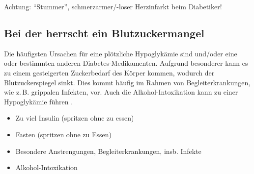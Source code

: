 \begin{Danger}
  \item Achtung: \enquote{Stummer}, schmerzarmer/-loser Herzinfarkt beim Diabetiker!
\end{Danger}



\subsection{Bei der  herrscht ein Blutzuckermangel}
\label{topic:hypoglykaemie}



{%
Die häufigsten Ursachen für eine plötzliche Hypoglykämie
sind  und/oder eine 
oder bestimmten anderen Diabetes-Medikamenten. 
Aufgrund
besonderer  kann es zu einem gesteigerten
Zuckerbedarf des Körper kommen, wodurch der
Blutzuckerspiegel sinkt. Dies kommt häufig im Rahmen von
Begleiterkrankungen, wie z.\,B. grippalen Infekten, vor.
Auch die Alkohol-Intoxikation kann zu einer Hypoglykämie
führen \citep{LoefflerBiochemie7}. 
}{%
\begin{itemize}
  \item Zu viel Insulin (spritzen ohne zu essen)
  \item Fasten (spritzen ohne zu Essen)
  \item Besondere Anstrengungen, Begleiterkrankungen,
  insb. Infekte
  \item Alkohol-Intoxikation
\end{itemize}
}{}{}{}






